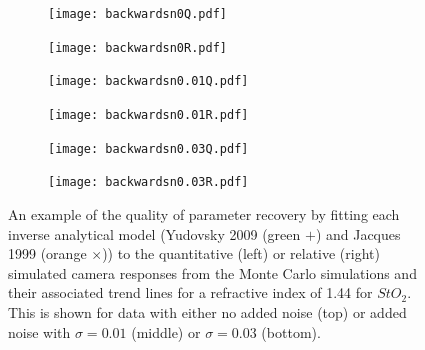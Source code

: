 \begin{figure}[htbp]
    \centering
    \begin{subfigure}{0.49\textwidth}
        \texttt{[image: backwardsn0Q.pdf]}
        \caption{}
        \label{fig:backwardsn0Q}
    \end{subfigure}
    \begin{subfigure}{0.49\textwidth}
        \texttt{[image: backwardsn0R.pdf]}
        \caption{}
        \label{fig:backwardsn0R}
    \end{subfigure}
    \begin{subfigure}{0.49\textwidth}
        \texttt{[image: backwardsn0.01Q.pdf]}
        \caption{}
        \label{fig:backwardsn0.01Q}
    \end{subfigure}
    \begin{subfigure}{0.49\textwidth}
        \texttt{[image: backwardsn0.01R.pdf]}
        \caption{}
        \label{fig:backwardsm0.01R}
    \end{subfigure}
    \begin{subfigure}{0.49\textwidth}
        \texttt{[image: backwardsn0.03Q.pdf]}
        \caption{}
        \label{fig:backwardsn0.03Q}
    \end{subfigure}
    \begin{subfigure}{0.49\textwidth}
        \texttt{[image: backwardsn0.03R.pdf]}
        \caption{}
        \label{fig:backwardsm0.03R}
    \end{subfigure}
    \caption{An example of the quality of parameter recovery by fitting each inverse analytical model (Yudovsky 2009 (\textcolor{MyGreen}{green $+$}) and Jacques 1999 (\textcolor{MyOrange}{orange $\times$})) to the quantitative (left) or relative (right) simulated camera responses from the Monte Carlo simulations and their associated trend lines for a refractive index of 1.44 for $StO_2$. This is shown for data with either no added noise (top) or added noise with $\sigma = 0.01$ (middle) or $\sigma = 0.03$ (bottom).}
    \label{fig:backwardsHSIMC1}
\end{figure}

